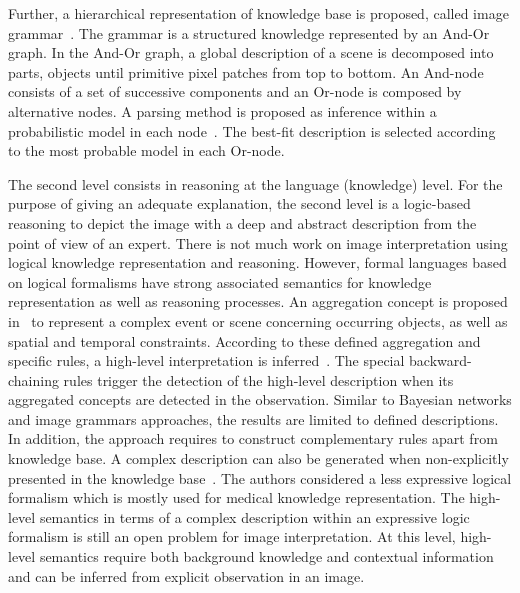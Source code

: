 \documentclass{article}
\begin{document}
Further, a hierarchical representation of knowledge base is proposed, called image grammar~\cite{tu2014joint,zhu2006stochastic}. The grammar is a structured knowledge represented by an And-Or graph.
In the And-Or graph, a global description of a scene is decomposed into parts, objects until primitive pixel patches from top to bottom.
An And-node consists of a set of successive components and an Or-node is composed by alternative nodes.
A parsing method is proposed as inference within a probabilistic model in each node~\cite{han2009bottom,wu2011numerical}. 
The best-fit description is selected according to the most probable model in each Or-node.

The second level consists in reasoning at the language (knowledge) level.
For the purpose of giving an adequate explanation, the second level is a logic-based reasoning to depict the image with a deep and abstract description from the point of view of an expert.
There is not much work on image interpretation using logical knowledge representation and reasoning. 
However, formal languages based on logical formalisms have  strong associated semantics for knowledge representation as well as reasoning processes. 
An aggregation concept is proposed in~\cite{Espinosa07multimedia} to represent a complex event or scene concerning occurring objects, as well as spatial and temporal constraints.
According to these defined aggregation and specific rules, a high-level interpretation is inferred~\cite{neumann2008scene}.
The special backward-chaining rules trigger the detection of the high-level description when its aggregated concepts are detected in the observation.
Similar to Bayesian networks and image grammars approaches,  the results are limited to defined descriptions.
In addition, the approach requires to construct complementary rules apart from knowledge base.
A complex description can also be generated when non-explicitly presented in the knowledge base~\cite{atif2014explanatory}.
The authors considered a less expressive logical formalism which is mostly used for medical knowledge representation.
The high-level semantics in terms of a complex description within an expressive logic formalism is still an open problem for image interpretation.
At this level, high-level semantics require both background knowledge and contextual information and can be inferred from explicit observation in an image.
\end{document}
